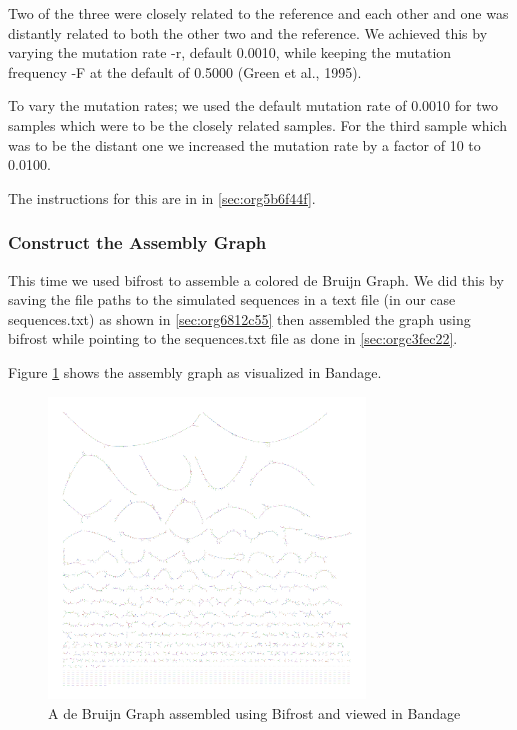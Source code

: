 \documentclass[10pt, a4paper]{article}
\begin{document}
Two of the three were closely related to the reference and each other and
one was distantly related to both the other two and the reference.
We achieved this by varying the mutation rate -r, default 0.0010, while keeping
the mutation frequency -F at the default of 0.5000 (Green et al., 1995).

To vary the mutation rates; we used the default mutation rate of 0.0010 for
two samples which were to be the closely related samples. 
For the third sample which was to be the distant one we increased the mutation 
rate by a factor of 10 to 0.0100. 

The instructions for this are in in \ref{sec:org5b6f44f}.

\subsubsection{Construct the Assembly Graph}
\label{sec:org805fb98}
This time we used bifrost \cite{holleyBifrostHighlyParallel2019} to assemble a
colored de Bruijn Graph. 
We did this by saving the file paths to the simulated sequences in a text file
(in our case sequences.txt) as shown in \ref{sec:org6812c55} then assembled
the graph using bifrost  while pointing to the sequences.txt file as done in
\ref{sec:orgc3fec22}.

Figure \ref{fig:org9b012c5} shows the assembly graph as visualized in Bandage.

\begin{figure}[h]
\centering
\includegraphics[width=0.75\textwidth]{../Figures/SARS_CoV_2/SARS_Assembly_Graph.png}
\caption[SARS-CoV-2 Assembly Graph]{\label{fig:org9b012c5}
A de Bruijn Graph assembled using Bifrost and viewed in Bandage}
\end{figure}
\end{document}
